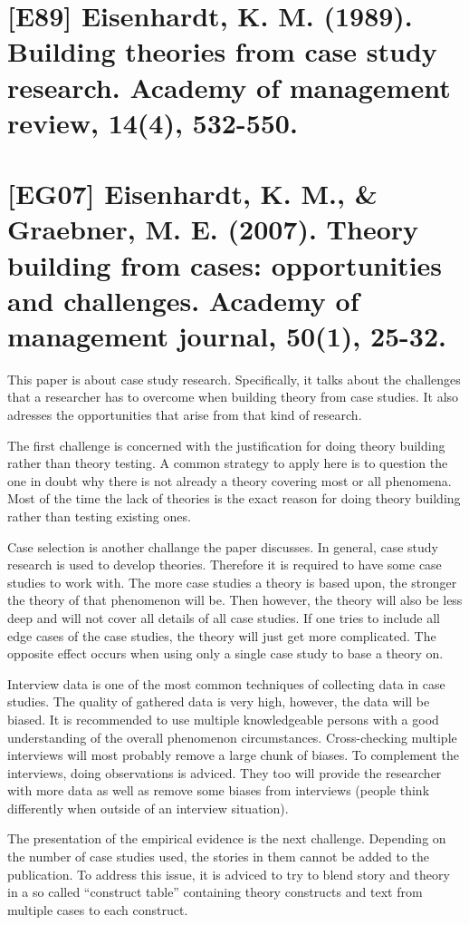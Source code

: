 \documentclass[a4paper,12pt,english]{scrartcl}
\newcommand{\papertitle}[2]{
	\section{[#1] #2}
}
\begin{document}
\pagestyle{fancy} %

\papertitle{E89}{Eisenhardt, K. M. (1989). Building theories from case study research. Academy of management review, 14(4), 532-550.}


\newpage

\papertitle{EG07}{Eisenhardt, K. M., \& Graebner, M. E. (2007). Theory building from cases: opportunities and challenges. Academy of management journal, 50(1), 25-32.}

This paper is about case study research. Specifically, it talks about the challenges that a researcher has to overcome when building theory from case studies. It also adresses the opportunities that arise from that kind of research.

The first challenge is concerned with the justification for doing theory building rather than theory testing. A common strategy to apply here is to question the one in doubt why there is not already a theory covering most or all phenomena. Most of the time the lack of theories is the exact reason for doing theory building rather than testing existing ones.

Case selection is another challange the paper discusses. In general, case study research is used to develop theories. Therefore it is required to have some case studies to work with. The more case studies a theory is based upon, the stronger the theory of that phenomenon will be. Then however, the theory will also be less deep and will not cover all details of all case studies. If one tries to include all edge cases of the case studies, the theory will just get more complicated. The opposite effect occurs when using only a single case study to base a theory on.

Interview data is one of the most common techniques of collecting data in case studies. The quality of gathered data is very high, however, the data will be biased. It is recommended to use multiple knowledgeable persons with a good understanding of the overall phenomenon circumstances. Cross-checking multiple interviews will most probably remove a large chunk of biases. To complement the interviews, doing observations is adviced. They too will provide the researcher with more data as well as remove some biases from interviews (people think differently when outside of an interview situation).

The presentation of the empirical evidence is the next challenge. Depending on the number of case studies used, the stories in them cannot be added to the publication. To address this issue, it is adviced to try to blend story and theory in a so called \enquote{construct table} containing theory constructs and text from multiple cases to each construct.
\end{document}
